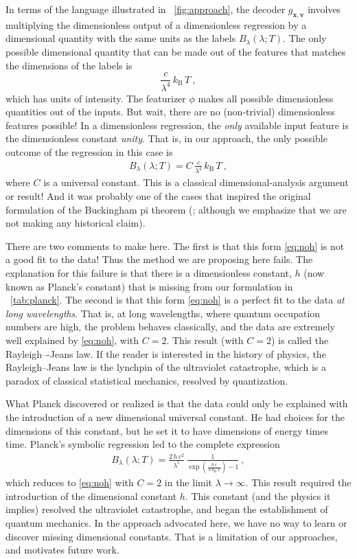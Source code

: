 \documentclass[twoside,11pt]{article}
\newcommand{\figref}[1]{\figurename~\ref{#1}}
\newcommand{\tabref}[1]{\tablename~\ref{#1}}
\newcommand{\kB}{k_{\mathrm{B}}}
\begin{document}
In terms of the language illustrated in \figref{fig:approach}, the decoder $g_{\mathbf{x},\mathbf{v}}$ involves multiplying the dimensionless output of a dimensionless regression by a dimensional quantity with the same units as the labels $B_\lambda(\lambda;T)$.
The only possible dimensional quantity that can be made out of the features that matches the dimensions of the labels is
\begin{equation}
    \frac{c}{\lambda^4}\,\kB\,T ~,
\end{equation}
which has units of intensity.
The featurizer $\phi$ makes all possible dimensionless quantities out of the inputs.
But wait, there are no (non-trivial) dimensionless features possible!
In a dimensionless regression, the \emph{only} available input feature is the dimensionless constant \emph{unity}.
That is, in our approach, the only possible outcome of the regression in this case is
\begin{eqnarray}\label{eq:noh}
    B_\lambda(\lambda;T) = C\,\frac{c}{\lambda^4}\,\kB\,T ~,
\end{eqnarray}
where $C$ is a universal constant.
This is a classical dimensional-analysis argument or result!
And it was probably one of the cases that inspired the original formulation of the Buckingham pi theorem (\citealt{buckingham1914pi}; although we emphasize that we are not making any historical claim).

There are two comments to make here.
The first is that this form \eqref{eq:noh} is not a good fit to the data!
Thus the method we are proposing here fails.
The explanation for this failure is that there is a dimensionless constant, $h$ (now known as Planck's constant) that is missing from our formulation in \tabref{tab:planck}.
The second is that this form \eqref{eq:noh} is a perfect fit to the data \emph{at long wavelengths}.
That is, at long wavelengths, where quantum occupation numbers are high, the problem behaves classically, and the data are extremely well explained by \eqref{eq:noh}, with $C=2$.
This result (with $C=2$) is called the Rayleigh–-Jeans law.
If the reader is interested in the history of physics, the Rayleigh--Jeans law is the lynchpin of the ultraviolet catastrophe, which is a paradox of classical statistical mechanics, resolved by quantization.

What Planck discovered or realized is that the data could only be explained with the introduction of a new dimensional universal constant.
He had choices for the dimensions of this constant, but he set it to have dimensions of energy times time.
Planck's symbolic regression led to the complete expression
\begin{eqnarray}
    B_\lambda(\lambda;T) = \frac{2\,h\,c^2}{\lambda^5}\,\frac{1}{\exp(\frac{h\,c}{\lambda\,\kB\,T})-1}~,
\end{eqnarray}
which reduces to \eqref{eq:noh} with $C=2$ in the limit $\lambda\rightarrow\infty$.
This result required the introduction of the dimensional constant $h$.
This constant (and the physics it implies) resolved the ultraviolet catastrophe, and began the establishment of quantum mechanics.
In the approach advocated here, we have no way to learn or discover missing dimensional constants.
That is a limitation of our approaches, and motivates future work.
\end{document}
